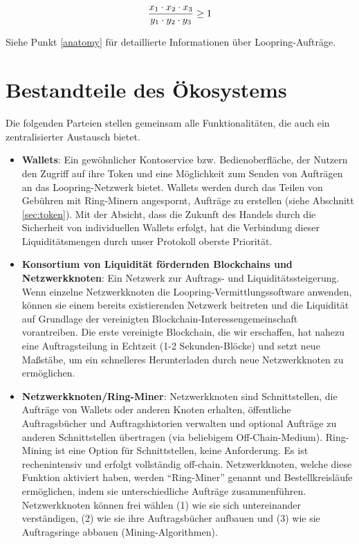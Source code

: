 \documentclass[UTF8,nofonts]{article}
\begin{document}
\begin{multicols}{2}
\begin{equation}
{{x_1 \cdot x_2 \cdot x_3 \over y_1 \cdot y_2 \cdot y_3} \geq 1}
\end{equation}


Siehe Punkt \ref{anatomy} für detaillierte Informationen über Loopring-Aufträge.



\section{Bestandteile des Ökosystems\label{sec:ecosystem}}
Die folgenden Parteien stellen gemeinsam alle Funktionalitäten, die auch ein zentralisierter Austausch bietet.

\begin{itemize}

\item \textbf{Wallets}: Ein gewöhnlicher Kontoservice bzw. Bedienoberfläche, der Nutzern den Zugriff auf ihre Token und eine Möglichkeit zum Senden von Aufträgen an das Loopring-Netzwerk bietet. Wallets werden durch das Teilen von Gebühren mit Ring-Minern angespornt, Aufträge zu erstellen (siehe Abschnitt \ref{sec:token}). Mit der Absicht, dass die Zukunft des Handels durch die Sicherheit von individuellen Wallets erfolgt, hat die Verbindung dieser Liquiditätsmengen durch unser Protokoll oberste Priorität.

\item \textbf{Konsortium von Liquidität fördernden Blockchains und Netzwerkknoten}: Ein Netzwerk zur Auftrags- und Liquiditätssteigerung. Wenn einzelne Netzwerkknoten die Loopring-Vermittlungssoftware anwenden, können sie einem bereits existierenden Netzwerk beitreten und die Liquidität auf Grundlage der vereinigten Blockchain-Interessengemeinschaft vorantreiben. Die erste vereinigte Blockchain, die wir erschaffen, hat nahezu eine Auftragsteilung in Echtzeit (1-2 Sekunden-Blöcke) und setzt neue Maßstäbe, um ein schnelleres Herunterladen durch neue Netzwerkknoten zu ermöglichen.

\item \textbf{Netzwerkknoten/Ring-Miner}: Netzwerkknoten sind Schnittstellen, die Aufträge von Wallets oder anderen Knoten erhalten, öffentliche Auftragsbücher und Auftragshistorien verwalten und optional Aufträge zu anderen Schnittstellen übertragen (via beliebigem Off-Chain-Medium). Ring-Mining ist eine Option für Schnittstellen, keine Anforderung. Es ist rechenintensiv und erfolgt vollständig off-chain. Netzwerkknoten, welche diese Funktion aktiviert haben, werden \enquote{Ring-Miner} genannt und Bestellkreisläufe ermöglichen, indem sie unterschiedliche Aufträge zusammenführen. Netzwerkknoten können frei wählen (1) wie sie sich untereinander verständigen, (2) wie sie ihre Auftragsbücher aufbauen und (3) wie sie Auftragsringe abbauen (Mining-Algorithmen).


\end{itemize}
\end{multicols}
\end{document}
